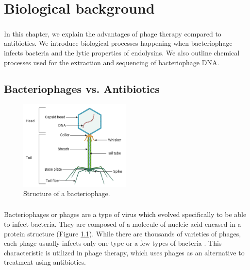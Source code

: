 \chapter{Biological background}

\label{kap:background} %
\paragraph*{}
In this chapter, we explain the advantages of phage therapy compared to antibiotics. We introduce biological processes happening when bacteriophage infects bacteria and the lytic properties of endolysins. We also outline chemical processes used for the extraction and sequencing of bacteriophage DNA.

\section{Bacteriophages vs. Antibiotics}

\begin{figure}[h]
  \begin{center}
     \includegraphics[width=0.5\textwidth]{images/bacteriophage.png}
     \caption{Structure of a bacteriophage.}\label{fig:phage}
  \end{center}
\end{figure} 

\paragraph*{}
Bacteriophages or phages are a type of virus which evolved specifically to be able to infect bacteria. They are composed of a molecule of nucleic acid encased in a protein structure (Figure \ref{fig:phage}). While there are thousands of varieties of phages, each phage usually infects only one type or a few types of bacteria \cite{guttman2005basic}. This characteristic is utilized in phage therapy, which uses phages as an alternative to treatment using antibiotics. 

